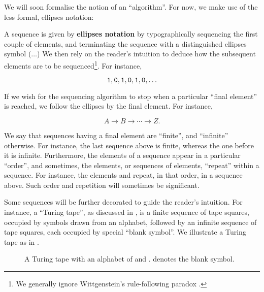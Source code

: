 We will soon formalise the notion of an ``algorithm''. For now, we make use of
the less formal, ellipses notation:

\begin{notation} A sequence is given by \textbf{ellipses notation} by
typographically sequencing the first couple of elements, and terminating the
sequence with a distinguished ellipses symbol ($\ldots$) We then rely on the
reader's intuition to deduce how the subsequent elements are to be
sequenced\footnote{We generally ignore Wittgenstein's rule-following paradox
\cite[\textsection~201, p.  69]{wittgenstein-1953}.}. For instance,

$$\mathtt{1},\mathtt{0},\mathtt{1},\mathtt{0},\mathtt{1},\mathtt{0},\ldots$$

If we wish for the sequencing algorithm to stop when a particular ``final
element'' is reached, we follow the ellipses by the final element. For instance,

$$A\rightarrow B \rightarrow \cdots \rightarrow Z.$$

\end{notation}

We say that sequences having a final element are ``finite'', and ``infinite''
otherwise. For instance, the last sequence above is finite, whereas the one
before it is infinite.  Furthermore, the elements of a sequence appear in a
particular ``order'', and sometimes, the elements, or sequences of elements,
``repeat'' within a sequence. For instance, the elements  and 
repeat, in that order, in a sequence above. Such order and repetition will
sometimes be significant.

Some sequences will be further decorated to guide the reader's intuition. For
instance, a ``Turing tape'', as discussed in
, is a finite sequence of tape squares,
occupied by symbols drawn from an alphabet, followed by an infinite sequence of
tape squares, each occupied by special ``blank symbol''. We illustrate a Turing
tape as in .
 
\begin{figure}[h!]
\centering
{}
\caption[]{A Turing tape with an alphabet of  and .
\blank{} denotes the blank symbol.}
\label{fig:informal-turing-tape}
\end{figure}

